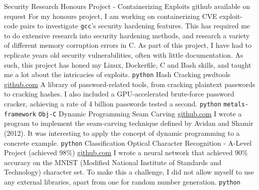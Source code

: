 \documentclass[9pt]{developercv} %
\begin{document}
\vspace{-20 pt}
\begin{entrylist}
 	\entry
		{Security Research}
		{Honours Project - Containerizing Exploits}
    {github available on request}
		{
      For my honours project, I am working on containerizing CVE exploit-code pairs to investigate \texttt{gcc}'s security hardening features.      This has required me to do extensive research into security hardening methods, and research a variety of different memory corruption errors in C. 
      As part of this project, I have had to replicate years old security vulnerabilities, often with little documentation. 
      As such, this project has honed my Linux, Dockerfile, C and Bash skills, and taught me a lot about the intricacies of exploits.
			\newline
			\texttt{python}
		}  
    \entry
		{Hash Cracking}
		{pwdtools}
		{\href{https://github.com/JacobInwald/pwdtools}{github.com}}
		{
			A library of password-related tools, from cracking plaintext passwords to cracking hashes. 
			I also included a GPU-accelerated brute-force password cracker, achieving a rate of 4 billion passwords tested a second. 
			\newline
			\texttt{python} \slashsep \texttt{metals-framework} \slashsep \texttt{Obj-C}
		}
    \entry
		{Dynamic Programming}
		{Seam Carving}
		{\href{https://github.com/JacobInwald/Seam-Carving}{github.com}}
		{
			I wrote a program to implement the seam-carving technique defined by Avidan and Shamir (2012). 
		 	It was interesting to apply the concept of dynamic programming to a concrete example.
			 \newline
			 \texttt{python}
		}
    \entry
		{Classification}
		{Optical Character Recognition - A-Level Project (achieved 98\%)}
		{\href{https://github.com/JacobInwald/OCRAlgebra}{github.com}}
		{
			I wrote a neural network that achieved 90\% accuracy on the MNIST (Modified National Institute of Standards and Technology) character set. 
			To make this a challenge, I did not allow myself to use any external libraries, apart from one for random number generation.  
			\newline
			\texttt{python}
		}
\end{entrylist}
\end{document}

